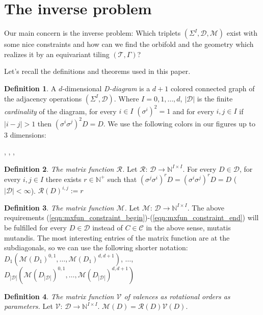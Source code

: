\documentclass[12pt,a4paper]{article}
\numberwithin{equation}{section}
\theoremstyle{plain}%
\theoremstyle{definition}
\newtheorem{defn}{Definition}[section]
\theoremstyle{remark}
\begin{document}
\section{The inverse problem}
Our main concern is the inverse problem: Which triplets
$(\Sigma^I,\mathcal{D},\mathcal{M})$ exist with some nice constraints and how
can we find the orbifold and the geometry which realizes it by an equivariant tiling
$(\mathcal{T},\Gamma)$?

Let's recall the definitions and theorems used in this paper.
\begin{defn}
  A $d$-dimensional {\em D-diagram} is a $d+1$ colored connected graph of the
  adjacency operations $(\Sigma^I,\mathcal{D})$. Where $I={0, 1, \ldots, d}$,
  $|\mathcal{D}|$ is the finite {\em cardinality} of the diagram, for every $i\in
  I$ $(\sigma^i)^2=1$ and for every $i,j\in I$ if $|i-j|>1$ then
  $(\sigma^i\sigma^j)^2D=D$. We use the following colors in our figures up to 3
  dimensions:

  \usebox{\LegendVertex}, \usebox{\LegendEdge}, \usebox{\LegendFace},
  \usebox{\LegendBody}
\end{defn}

\begin{defn}
  {\em The matrix function $\mathcal{R}$.}
  Let $\mathcal{R}$: $\mathcal{D} \rightarrow \mathbb{N}^{I\times I}$.
  For every $D\in\mathcal{D}$, for every $i,j\in I$ there exists $r\in
  \mathbb{N}^+$ such that
  $(\sigma^j\sigma^i)^rD=(\sigma^i\sigma^j)^rD=D$ ($|\mathcal{D}|<\infty$).
  $\mathcal{R}(D)^{i,j}:=r$
\end{defn}
  
\begin{defn}
  {\em The matrix function $\mathcal{M}$.}
  Let $\mathcal{M}$: $\mathcal{D} \rightarrow \mathbb{N}^{I\times I}$.
  The above requirements
  (\ref{eqn:mxfun_constraint_begin})-(\ref{eqn:mxfun_constraint_end}) will be
  fulfilled for every $D\in\mathcal{D}$ instead of $C\in\mathcal{C}$ in the
  above sense, mutatis mutandis.
  The most interesting entries of the matrix function are at the subdiagonals, so
  we can use the following shorter notation:
  $D_1(\mathcal{M}(D_1)^{0,1},\ldots,\mathcal{M}(D_1)^{d,d+1})$, $\ldots$,
  $D_{|\mathcal{D}|}(\mathcal{M}(D_{|\mathcal{D}|})^{0,1},\ldots,\mathcal{M}(D_{|\mathcal{D}|})^{d,d+1})$
\end{defn}

\begin{defn}
  {\em The matrix function $\mathcal{V}$ of valences as rotational orders
  as parameters.}
  Let $\mathcal{V}$: $\mathcal{D} \rightarrow \mathbb{N}^{I\times I}$.
  $\mathcal{M}(D)=\mathcal{R}(D)\mathcal{V}(D)$.
\end{defn}
\end{document}
